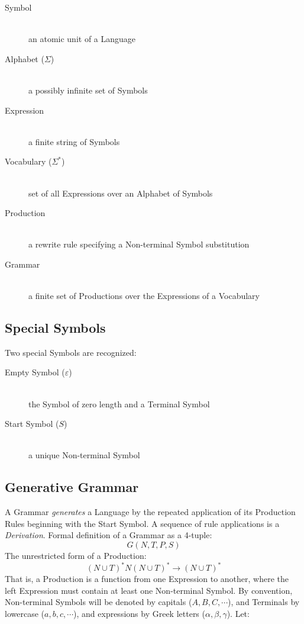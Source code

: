 \documentclass{article}
\begin{document}
    \begin{description}

    \item[Symbol] \hfill \\
    an atomic unit of a Language

    \item[Alphabet ($\Sigma$)] \hfill \\
    a possibly infinite set of Symbols

    \item[Expression] \hfill \\
    a finite string of Symbols

    \item[Vocabulary ($\Sigma^{*}$)] \hfill \\
    set of all Expressions over an Alphabet of Symbols

    \item[Production] \hfill \\
    a rewrite rule specifying a Non-terminal Symbol substitution

    \item[Grammar] \hfill \\
    a finite set of Productions over the Expressions of a Vocabulary

    \end{description}

\subsection{Special Symbols}
Two special Symbols are recognized:

    \begin{description}

    \item[Empty Symbol ($\varepsilon$)] \hfill \\
    the Symbol of zero length and a Terminal Symbol

    \item[Start Symbol ($S$)] \hfill \\
    a unique Non-terminal Symbol

    \end{description}

\subsection{Generative Grammar}

A Grammar \emph{generates} a Language by the repeated application of
its Production Rules beginning with the Start Symbol. A sequence of
rule applications is a \emph{Derivation}. Formal definition of a
Grammar as a 4-tuple:
\[
    G(N,T,P,S)
\]
The unrestricted form of a Production:
\[
    (N \cup T)^*N(N \cup T)^* \rightarrow (N \cup T)^*
\]
That is, a Production is a function from one Expression to
another, where the left Expression must contain at least one
Non-terminal Symbol. By convention, Non-terminal Symbols
will be denoted by capitals ($A,B,C,\cdots$), and Terminals by
lowercase ($a,b,c,\cdots$), and expressions by Greek letters
($\alpha,\beta,\gamma$). Let:
\end{document}
